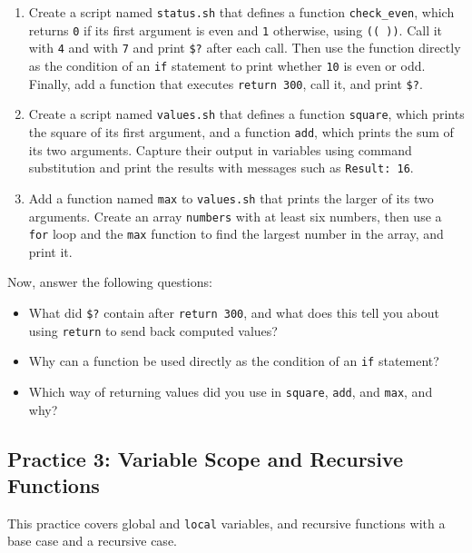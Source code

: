 \begin{enumerate}
    \item Create a script named \texttt{status.sh} that defines a function \texttt{check\_even}, which returns \texttt{0} if its first argument is even and \texttt{1} otherwise, using \texttt{(( ))}. Call it with \texttt{4} and with \texttt{7} and print \texttt{\$?} after each call. Then use the function directly as the condition of an \texttt{if} statement to print whether \texttt{10} is even or odd. Finally, add a function that executes \texttt{return 300}, call it, and print \texttt{\$?}.
    \item Create a script named \texttt{values.sh} that defines a function \texttt{square}, which prints the square of its first argument, and a function \texttt{add}, which prints the sum of its two arguments. Capture their output in variables using command substitution and print the results with messages such as \texttt{Result: 16}.
    \item Add a function named \texttt{max} to \texttt{values.sh} that prints the larger of its two arguments. Create an array \texttt{numbers} with at least six numbers, then use a \texttt{for} loop and the \texttt{max} function to find the largest number in the array, and print it.
\end{enumerate}

Now, answer the following questions:
\begin{itemize}
    \item What did \texttt{\$?} contain after \texttt{return 300}, and what does this tell you about using \texttt{return} to send back computed values?
    \item Why can a function be used directly as the condition of an \texttt{if} statement?
    \item Which way of returning values did you use in \texttt{square}, \texttt{add}, and \texttt{max}, and why?
\end{itemize}

\subsection{Practice 3: Variable Scope and Recursive Functions}
This practice covers global and \texttt{local} variables, and recursive functions with a base case and a recursive case.

